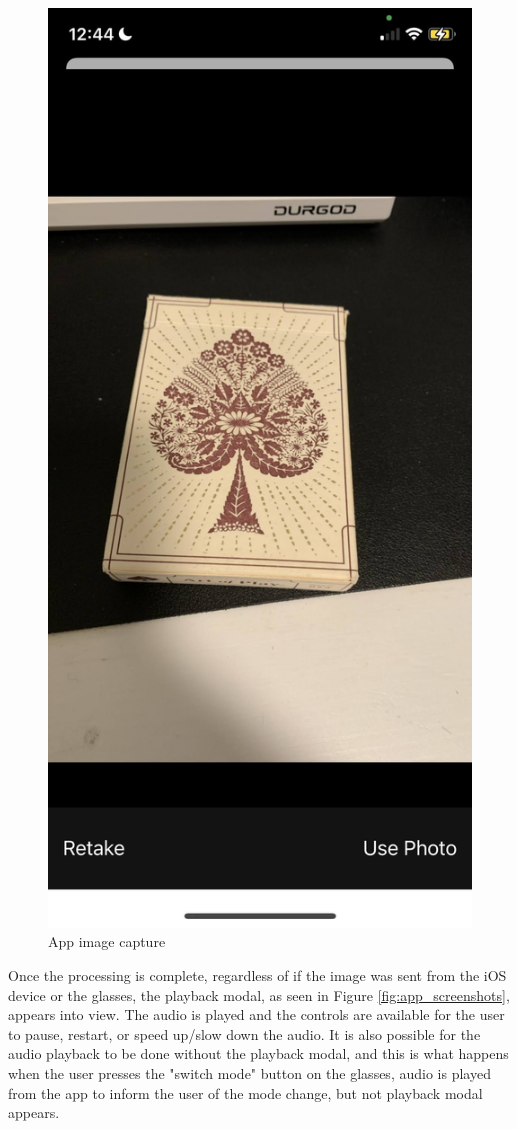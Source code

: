 \documentclass[a4paper,11pt]{article}
\begin{document}
\begin{figure}[H]
\includegraphics[scale=0.125]{img/app/capture2.png}
\caption{App image capture}
\label{fig:app_capture}
\end{figure}

Once the processing is complete, regardless of if the image was sent from the iOS device or the glasses, the playback modal, as seen in Figure \ref{fig:app_screenshots}, appears into view. The audio is played and the controls are available for the user to pause, restart, or speed up/slow down the audio. It is also possible for the audio playback to be done without the playback modal, and this is what happens when the user presses the "switch mode" button on the glasses, audio is played from the app to inform the user of the mode change, but not playback modal appears.
\end{document}
